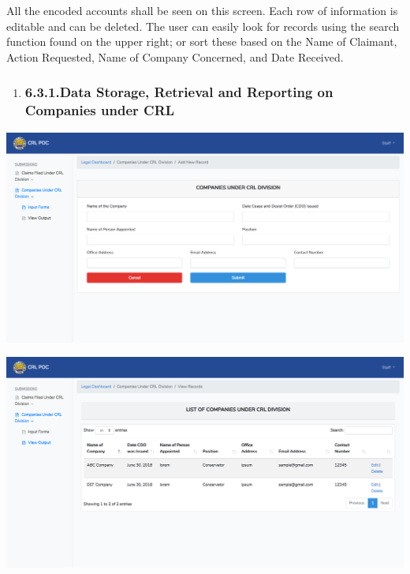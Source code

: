 \documentclass{article}
\begin{document}
All the encoded accounts shall be seen on this screen.
Each row of information is editable and can be deleted. The user can
easily look for records using the search function found on the upper
right; or sort these based on the Name of Claimant, Action Requested,
Name of Company Concerned, and Date Received.%

\begin{enumerate}[noitemsep,topsep=\mdcompacttopsep]%

\item{}
\subsubsection{6.3.1.\hspace*{0.5em}Data Storage, Retrieval and Reporting on Companies under CRL}\label{sec-data-storage-retrieval-and-reporting-on-companies-under-crl}%
\end{enumerate}%

\noindent{}\includegraphics[keepaspectratio=true]{up-ic-screens/image17}{}%

\includegraphics[keepaspectratio=true]{up-ic-screens/image169}{}%
\end{document}
